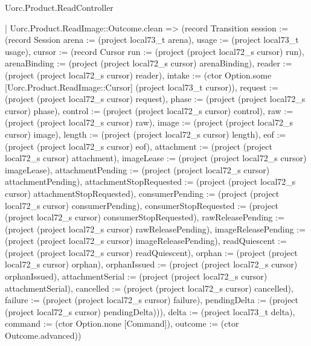 \begin{lexlean}{Uorc.Product.ReadController}
\begin{semanticmodule}
{    | Uorc.Product.ReadImage::Outcome.clean => (record Transition {session := (record Session {arena := (project local73_t arena), usage := (project local73_t usage), cursor := (record Cursor {run := (project (project local72_s cursor) run), arenaBinding := (project (project local72_s cursor) arenaBinding), reader := (project (project local72_s cursor) reader), intake := (ctor Option.some [Uorc.Product.ReadImage::Cursor] (project local73_t cursor)), request := (project (project local72_s cursor) request), phase := (project (project local72_s cursor) phase), control := (project (project local72_s cursor) control), raw := (project (project local72_s cursor) raw), image := (project (project local72_s cursor) image), length := (project (project local72_s cursor) length), eof := (project (project local72_s cursor) eof), attachment := (project (project local72_s cursor) attachment), imageLease := (project (project local72_s cursor) imageLease), attachmentPending := (project (project local72_s cursor) attachmentPending), attachmentStopRequested := (project (project local72_s cursor) attachmentStopRequested), consumerPending := (project (project local72_s cursor) consumerPending), consumerStopRequested := (project (project local72_s cursor) consumerStopRequested), rawReleasePending := (project (project local72_s cursor) rawReleasePending), imageReleasePending := (project (project local72_s cursor) imageReleasePending), readQuiescent := (project (project local72_s cursor) readQuiescent), orphan := (project (project local72_s cursor) orphan), orphanIssued := (project (project local72_s cursor) orphanIssued), attachmentSerial := (project (project local72_s cursor) attachmentSerial), cancelled := (project (project local72_s cursor) cancelled), failure := (project (project local72_s cursor) failure), pendingDelta := (project (project local72_s cursor) pendingDelta)})}), delta := (project local73_t delta), command := (ctor Option.none [Command]), outcome := (ctor Outcome.advanced)})
}
\end{semanticmodule}
\end{lexlean}
